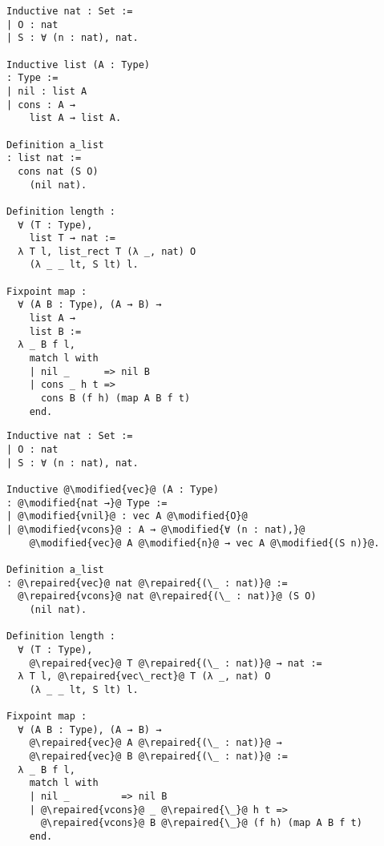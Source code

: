 \begin{figure*}[!htp]

  \noindent%
  \begin{minipage}[t]{0.50\textwidth}
    \begin{verbatim}
Inductive nat : Set :=
| O : nat
| S : ∀ (n : nat), nat.

Inductive list (A : Type)
: Type :=
| nil : list A
| cons : A →
    list A → list A.

Definition a_list
: list nat :=
  cons nat (S O)
    (nil nat).

Definition length :
  ∀ (T : Type),
    list T → nat :=
  λ T l, list_rect T (λ _, nat) O
    (λ _ _ lt, S lt) l.

Fixpoint map :
  ∀ (A B : Type), (A → B) →
    list A →
    list B :=
  λ _ B f l,
    match l with
    | nil _      => nil B
    | cons _ h t =>
      cons B (f h) (map A B f t)
    end.
  \end{verbatim}
\end{minipage}%
\begin{minipage}[t]{0.50\textwidth}
  \begin{verbatim}
Inductive nat : Set :=
| O : nat
| S : ∀ (n : nat), nat.

Inductive @\modified{vec}@ (A : Type)
: @\modified{nat →}@ Type :=
| @\modified{vnil}@ : vec A @\modified{O}@
| @\modified{vcons}@ : A → @\modified{∀ (n : nat),}@
    @\modified{vec}@ A @\modified{n}@ → vec A @\modified{(S n)}@.

Definition a_list
: @\repaired{vec}@ nat @\repaired{(\_ : nat)}@ :=
  @\repaired{vcons}@ nat @\repaired{(\_ : nat)}@ (S O)
    (nil nat).

Definition length :
  ∀ (T : Type),
    @\repaired{vec}@ T @\repaired{(\_ : nat)}@ → nat :=
  λ T l, @\repaired{vec\_rect}@ T (λ _, nat) O
    (λ _ _ lt, S lt) l.

Fixpoint map :
  ∀ (A B : Type), (A → B) →
    @\repaired{vec}@ A @\repaired{(\_ : nat)}@ →
    @\repaired{vec}@ B @\repaired{(\_ : nat)}@ :=
  λ _ B f l,
    match l with
    | nil _         => nil B
    | @\repaired{vcons}@ _ @\repaired{\_}@ h t =>
      @\repaired{vcons}@ B @\repaired{\_}@ (f h) (map A B f t)
    end.
  \end{verbatim}
\end{minipage}

\caption{ We demonstrate the propagation of repairs after an inductive
definition is modified.  On the left, the original program.  On the right, we
highlight the user-modified parts in yellow.  The computed repairs are
highlighted in green. }

\label{listtovec}

\end{figure*}
